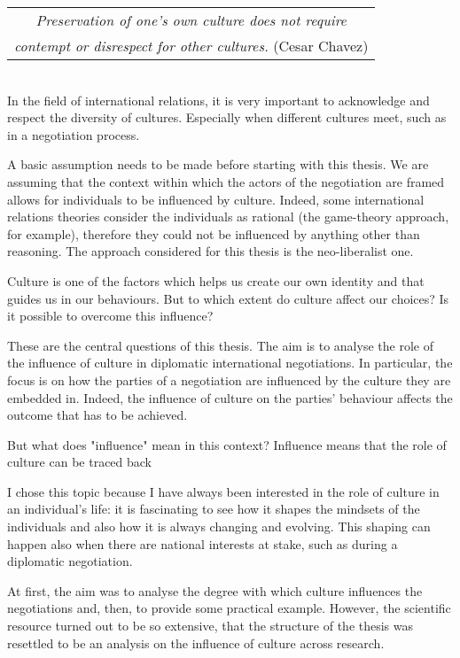 \documentclass[../main.tex]{subfiles}
\begin{document}
  \begin{tabular}{c}
 \textit{Preservation of one's own culture does not require}\\
 \textit{contempt or disrespect for other cultures.} (Cesar Chavez)\\
  \end{tabular}\\


In the field of international relations, it is very important to acknowledge and respect the diversity of cultures. Especially when different cultures meet, such as in a negotiation process.

A basic assumption needs to be made before starting with this thesis. We are assuming that the context within which the actors of the negotiation are framed allows for individuals to be influenced by culture.
Indeed, some international relations theories consider the individuals as rational (the game-theory approach, for example), therefore they could not be influenced by anything other than reasoning. The approach considered for this thesis is the neo-liberalist one.

Culture is one of the factors which helps us create our own identity and that guides us in our behaviours. But to which extent do culture affect our choices? Is it possible to overcome this influence?

These are the central questions of this thesis. The aim is to analyse the role of the influence of culture in diplomatic international negotiations. In particular, the focus is on how the parties of a negotiation are influenced by the culture they are embedded in. Indeed, the influence of culture on the parties' behaviour affects the outcome that has to be achieved.

But what does "influence" mean in this context? Influence means that the role of culture can be traced back


I chose this topic because I have always been interested in the role of culture in an individual's life: it is fascinating to see how it shapes the mindsets of the individuals and also how it is always changing and evolving. This shaping can happen also when there are national interests at stake, such as during a diplomatic negotiation.

At first, the aim was to analyse the degree with which culture influences the negotiations and, then, to provide some practical example. However, the scientific resource turned out to be so extensive, that the structure of the thesis was resettled to be an analysis on the influence of culture across research.
\end{document}
